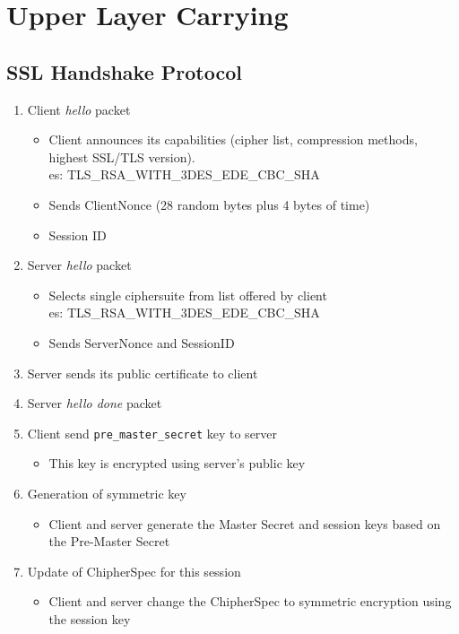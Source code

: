 \documentclass{article}
\begin{document}
\section{Upper Layer Carrying}

\subsection{SSL Handshake Protocol}
\begin{enumerate}
    \item Client \textit{hello} packet
    \begin{itemize}
        \item Client announces its capabilities (cipher list, compression methods, highest SSL/TLS version).
        \\es: TLS\_RSA\_WITH\_3DES\_EDE\_CBC\_SHA
        \item Sends ClientNonce (28 random bytes plus 4 bytes of time)
        \item Session ID
    \end{itemize}
    \item Server \textit{hello} packet
    \begin{itemize}
        \item Selects single ciphersuite from list offered by client
        \\es: TLS\_RSA\_WITH\_3DES\_EDE\_CBC\_SHA
        \item Sends ServerNonce and SessionID
    \end{itemize}
    \item Server sends its public certificate to client
    \item Server \textit{hello done} packet
    \item Client send \texttt{pre\_master\_secret} key to server
    \begin{itemize}
        \item This key is encrypted using server's public key
    \end{itemize}
    \item Generation of symmetric key
    \begin{itemize}
        \item Client and server generate the Master Secret and session keys based on the Pre-Master Secret
    \end{itemize}
    \item Update of ChipherSpec for this session
    \begin{itemize}
        \item Client and server change the ChipherSpec to symmetric encryption using the session key
    \end{itemize}
\end{enumerate}
\end{document}
